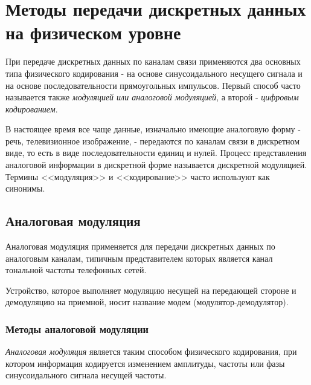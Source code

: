 \chapter{Методы передачи дискретных данных на физическом уровне}

При передаче дискретных данных по каналам связи применяются два основных типа физического кодирования - на основе синусоидального несущего сигнала и на основе последовательности прямоугольных импульсов.
Первый способ часто называется также \emph{модуляцией или аналоговой модуляцией}, а второй - \emph{цифровым кодированием}.

В настоящее время все чаще данные, изначально имеющие аналоговую форму - речь, телевизионное изображение, - передаются по каналам связи в дискретном виде, то есть в виде последовательности единиц и нулей.
Процесс представления аналоговой информации в дискретной форме называется дискретной модуляцией.
Термины <<модуляция>> и <<кодирование>> часто используют как синонимы.

\section{Аналоговая модуляция}

Аналоговая модуляция применяется для передачи дискретных данных по аналоговым каналам, типичным представителем которых является канал тональной частоты телефонных сетей.

\begin{comment}
    Типичная амплитудно-частотная характеристика канала тональной частоты представлена на рисунке.

    Этот канал передает частоты в диапазоне от 300 до 3400 Гц, а его полоса пропускания составляет 3100 Гц, что обеспечивает приемлемое качество распознаваемости речи.
    Строгое ограничение полосы пропускания тонального канала связано с использованием частотной аппаратуры уплотнения.
\end{comment}

Устройство, которое выполняет модуляцию несущей на передающей стороне и демодуляцию на приемной, носит название модем (модулятор-демодулятор).

\subsection{Методы аналоговой модуляции}

\emph{Аналоговая модуляция} является таким способом физического кодирования, при котором информация кодируется изменением амплитуды, частоты или фазы синусоидального сигнала несущей частоты.

